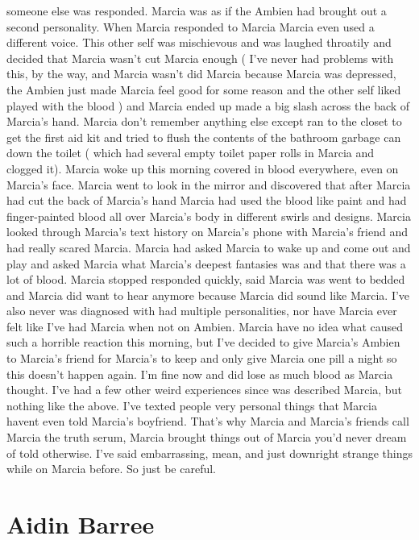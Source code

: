 \documentclass[12pt]{book}
\begin{document}
someone else was responded. Marcia was as if the Ambien had brought out a second personality. When Marcia responded to Marcia Marcia even used a different voice. This other self was mischievous and was laughed throatily and decided that Marcia wasn't cut Marcia enough ( I've never had problems with this, by the way, and Marcia wasn't did Marcia because Marcia was depressed, the Ambien just made Marcia feel good for some reason and the other self liked played with the blood ) and Marcia ended up made a big slash across the back of Marcia's hand. Marcia don't remember anything else except ran to the closet to get the first aid kit and tried to flush the contents of the bathroom garbage can down the toilet ( which had several empty toilet paper rolls in Marcia and clogged it). Marcia woke up this morning covered in blood everywhere, even on Marcia's face. Marcia went to look in the mirror and discovered that after Marcia had cut the back of Marcia's hand Marcia had used the blood like paint and had finger-painted blood all over Marcia's body in different swirls and designs. Marcia looked through Marcia's text history on Marcia's phone with Marcia's friend and had really scared Marcia. Marcia had asked Marcia to wake up and come out and play and asked Marcia what Marcia's deepest fantasies was and that there was a lot of blood. Marcia stopped responded quickly, said Marcia was went to bedded and Marcia did want to hear anymore because Marcia did sound like Marcia. I've also never was diagnosed with had multiple personalities, nor have Marcia ever felt like I've had Marcia when not on Ambien. Marcia have no idea what caused such a horrible reaction this morning, but I've decided to give Marcia's Ambien to Marcia's friend for Marcia's to keep and only give Marcia one pill a night so this doesn't happen again. I'm fine now and did lose as much blood as Marcia thought. I've had a few other weird experiences since was described Marcia, but nothing like the above. I've texted people very personal things that Marcia havent even told Marcia's boyfriend. That's why Marcia and Marcia's friends call Marcia the truth serum, Marcia brought things out of Marcia you'd never dream of told otherwise. I've said embarrassing, mean, and just downright strange things while on Marcia before. So just be careful.



\chapter{Aidin Barree}
\end{document}
